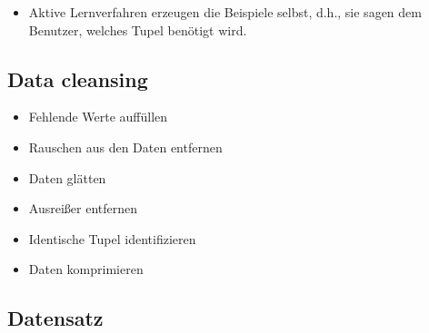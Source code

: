 \documentclass{scrartcl}
\begin{document}
\begin{itemize}
	\item Aktive Lernverfahren erzeugen die Beispiele selbst, d.h., sie sagen 
	dem Benutzer, welches Tupel benötigt wird.
\end{itemize}

\subsection{Data cleansing}

\begin{itemize}
	\item Fehlende Werte auffüllen
	\item Rauschen aus den Daten entfernen
	\item Daten glätten
	\item Ausreißer entfernen
	\item Identische Tupel identifizieren
	\item Daten komprimieren
\end{itemize}

\subsection{Datensatz}
\end{document}
